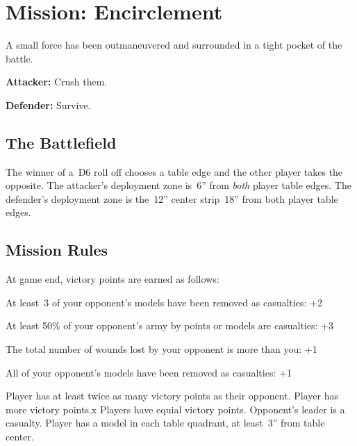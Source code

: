 \clearpage
\section{Mission: Encirclement}

  A small force has been outmaneuvered and surrounded in a tight
  pocket of the battle.

  \begin{squishitemize}
  \item {\bf Attacker:} Crush them.
  \item {\bf Defender:} Survive.
  \end{squishitemize}

\subsection{\bf The Battlefield}%

The winner of a~D6 roll off chooses a table edge and the other player
takes the opposite.  The attacker's deployment zone is~6'' from
\emph{both} player table edges.  The defender's deployment zone is
the~12'' center strip~18'' from both player table edges.


\subsection{\bf Mission Rules}%

At game end, victory points are earned as follows:

\begin{squishitemize}
\item At least~3 of your opponent's models have been removed as
  casualties: +2

\item At least 50\% of your opponent's army by points or models are
  casualties: +3

\item The total number of wounds lost by your opponent is more than
  you: +1

\item All of your opponent's models have been removed as casualties:
  +1
\end{squishitemize}

\vfill

\scoringbox%
{Player has at least twice as many victory points as their opponent.}%
{Player has more victory points.x}%
{Players have equial victory points.}%
{Opponent's leader is a casualty.}%
{Player has a model in each table quadrant, at least~3'' from table center.}

